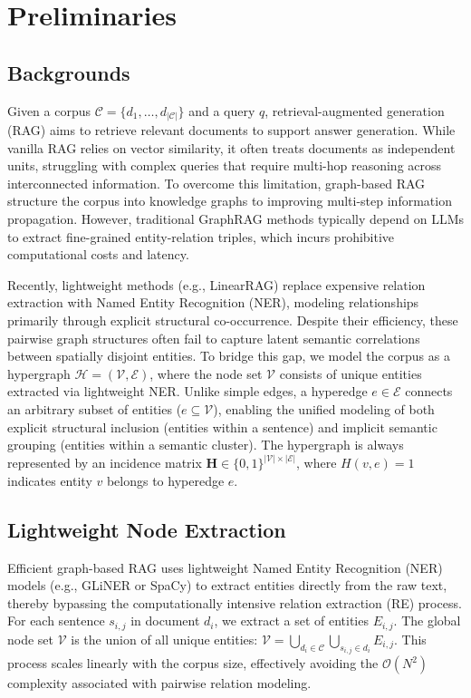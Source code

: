  \section{Preliminaries}
\subsection{Backgrounds}

Given a corpus $\mathcal{C} = \{d_1, \dots, d_{|\mathcal{C}|}\}$ and a query $q$, retrieval-augmented generation (RAG) aims to retrieve relevant documents to support answer generation. While vanilla RAG relies on vector similarity, it often treats documents as independent units, struggling with complex queries that require multi-hop reasoning across interconnected information. To overcome this limitation, graph-based RAG structure the corpus into knowledge graphs to improving multi-step information propagation. However, traditional GraphRAG methods typically depend on LLMs to extract fine-grained entity-relation triples, which incurs prohibitive computational costs and latency. 

Recently, lightweight methods (e.g., LinearRAG) replace expensive relation extraction with Named Entity Recognition (NER), modeling relationships primarily through explicit structural co-occurrence. Despite their efficiency, these pairwise graph structures often fail to capture latent semantic correlations between spatially disjoint entities. To bridge this gap, we model the corpus as a hypergraph $\mathcal{H} = (\mathcal{V}, \mathcal{E})$, where the node set $\mathcal{V}$ consists of unique entities extracted via lightweight NER. Unlike simple edges, a hyperedge $e \in \mathcal{E}$ connects an arbitrary subset of entities ($e \subseteq \mathcal{V}$), enabling the unified modeling of both explicit structural inclusion (entities within a sentence) and implicit semantic grouping (entities within a semantic cluster). The hypergraph is always represented by an incidence matrix $\mathbf{H} \in \{0, 1\}^{|\mathcal{V}| \times |\mathcal{E}|}$, where $H(v, e) = 1$ indicates entity $v$ belongs to hyperedge $e$.

\subsection{Lightweight Node Extraction}

Efficient graph-based RAG uses lightweight Named Entity Recognition (NER) models (e.g., GLiNER or SpaCy) to extract entities directly from the raw text, thereby bypassing the computationally intensive relation extraction (RE) process. For each sentence $s_{i,j}$ in document $d_i$, we extract a set of entities $E_{i,j}$. The global node set $\mathcal{V}$ is the union of all unique entities: $\mathcal{V} = \bigcup_{d_i \in \mathcal{C}} \bigcup_{s_{i,j} \in d_i} E_{i,j}$. This process scales linearly with the corpus size, effectively avoiding the $\mathcal{O}(N^2)$ complexity associated with pairwise relation modeling.
